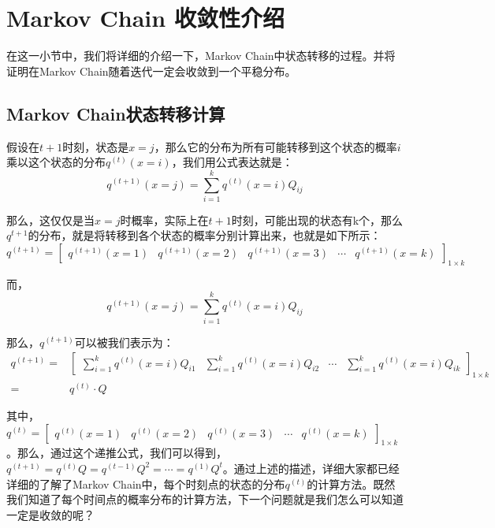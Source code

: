 \documentclass[a4paper]{article}
\begin{document}
\section{Markov Chain 收敛性介绍}
在这一小节中，我们将详细的介绍一下，Markov Chain中状态转移的过程。并将证明在Markov Chain随着迭代一定会收敛到一个平稳分布。

\subsection{Markov Chain状态转移计算}
假设在$t+1$时刻，状态是$x=j$，那么它的分布为所有可能转移到这个状态的概率$i$乘以这个状态的分布$q^{(t)}(x=i)$，我们用公式表达就是：
\begin{equation}
    q^{(t+1)}(x=j) = \sum_{i=1}^k q^{(t)}(x=i) Q_{ij}
\end{equation}

那么，这仅仅是当$x=j$时概率，实际上在$t+1$时刻，可能出现的状态有k个，那么$q^{t+1}$的分布，就是将转移到各个状态的概率分别计算出来，也就是如下所示：
\begin{equation}
    q^{(t+1)} = 
    \begin{bmatrix}
        q^{(t+1)}(x=1) & q^{(t+1)}(x=2) & q^{(t+1)}(x=3) & \cdots & q^{(t+1)}(x=k)  
    \end{bmatrix}_{1\times k}
\end{equation}

而，
\begin{equation}
    q^{(t+1)}(x=j) = \sum_{i=1}^k q^{(t)}(x=i) Q_{ij}
\end{equation}

那么，$q^{(t+1)}$可以被我们表示为：
\begin{equation}
\begin{split}
    q^{(t+1)} = &
    \begin{bmatrix}
        \sum_{i=1}^k q^{(t)}(x=i) Q_{i1} & \sum_{i=1}^k q^{(t)}(x=i) Q_{i2} & \cdots & \sum_{i=1}^k q^{(t)}(x=i) Q_{ik}
    \end{bmatrix}_{1 \times k} \\
    = & q^{(t)}\cdot Q
\end{split}
\end{equation}

其中，$q^{(t)} = \begin{bmatrix} q^{(t)}(x=1) & q^{(t)}(x=2) & q^{(t)}(x=3) & \cdots & q^{(t)}(x=k) \end{bmatrix}_{1\times k}$。那么，通过这个递推公式，我们可以得到，$q^{(t+1)} = q^{(t)}Q = q^{(t-1)}Q^2 = \cdots = q^{(1)}Q^t $。通过上述的描述，详细大家都已经详细的了解了Markov Chain中，每个时刻点的状态的分布$q^{(t)}$的计算方法。既然我们知道了每个时间点的概率分布的计算方法，下一个问题就是我们怎么可以知道一定是收敛的呢？
\end{document}
